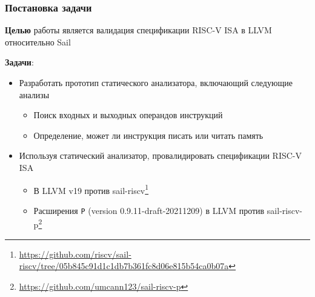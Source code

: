 \documentclass
  [ russian
  , aspectratio=169 %
  ] {beamer}
\begin{document}
\begin{frame}
    \frametitle{Постановка задачи}
    \textbf{Целью} работы является валидация спецификации RISC-V ISA в LLVM относительно Sail %

    \vspace{1em}
    \textbf{Задачи}:
    \begin{itemize}
        \item Разработать прототип статического анализатора, включающий следующие анализы
              \begin{itemize}
                  \item Поиск входных и выходных операндов инструкций
                  \item Определение, может ли инструкция писать или читать память
              \end{itemize}
        \item Используя статический анализатор, провалидировать спецификации RISC-V ISA
              \begin{itemize}
                  \item В LLVM v19 против sail-riscv\footnote[frame]{\url{https://github.com/riscv/sail-riscv/tree/05b845c91d1c1db7b361fc8d06e815b54ca0b07a}}
                  \item Расширения \texttt{P} (version 0.9.11-draft-20211209) в LLVM против sail-riscv-p\footnote[frame]{\url{https://github.com/umcann123/sail-riscv-p}}
              \end{itemize}
    \end{itemize}
\end{frame}
\end{document}
